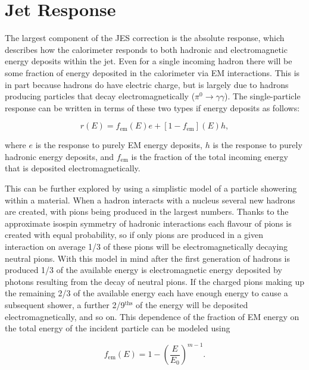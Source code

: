 \section{Jet Response}
\label{sec:JetResponse}
The largest component of the JES correction is the absolute response, which describes how the calorimeter responds to both hadronic and electromagnetic energy deposits within the jet.  
Even for a single incoming hadron there will be some fraction of energy deposited in the calorimeter via EM interactions.  
This is in part because hadrons do have electric charge, but is largely due to hadrons producing particles that decay electromagnetically ($\pi^0\rightarrow\gamma\gamma$).  
The single-particle response can be written in terms of these two types if energy deposits as follows:

\begin{equation}
  \label{SingleParticleResponse}
  r(E)=f_{\mathrm{em}}\left(E\right)e+\left[1-f_{\mathrm{em}}\right]\left(E\right)h,
 \end{equation}

\noindent
where $e$ is the response to purely EM energy deposits, $h$ is the response to purely hadronic energy deposits, and $f_{\mathrm{em}}$ is the fraction of the total incoming energy that is deposited electromagnetically.  

This can be further explored by using a simplistic model of a particle showering within a material.  
When a hadron interacts with a nucleus several new hadrons are created, with pions being produced in the largest numbers.  
Thanks to the approximate isospin symmetry of hadronic interactions each flavour of pions is created with equal probability, so if only pions are produced in a given interaction on average 1/3 of these pions will be electromagnetically decaying neutral pions.  
With this model in mind after the first generation of hadrons is produced 1/3 of the available energy is electromagnetic energy deposited by photons resulting from the decay of neutral pions.  
If the charged pions making up the remaining 2/3 of the available energy each have enough energy to cause a subsequent shower, a further 2/9$^{\mathrm{ths}}$ of the energy will be deposited electromagnetically, and so on.  
This dependence of the fraction of EM energy on the total energy of the incident particle can be modeled using

\begin{equation}
  \label{Grooms}
  f_{\mathrm{em}}\left(E\right)=1-\left(\frac{E}{E_0}\right)^{m-1}.
\end{equation} 

